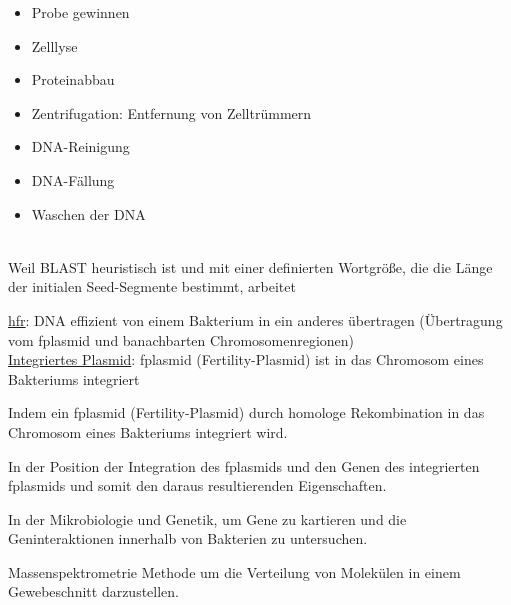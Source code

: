 \begin{itemize}
    \item Probe gewinnen 
    \item Zelllyse
    \item Proteinabbau
    \item Zentrifugation: Entfernung von Zelltrümmern
    \item DNA-Reinigung
    \item DNA-Fällung
    \item Waschen der DNA
\end{itemize} $\ $ \\
Weil BLAST heuristisch ist und mit einer definierten Wortgröße, die die Länge der initialen Seed-Segmente bestimmt, arbeitet \\ \newline

\underline{hfr}: DNA effizient von einem Bakterium in ein anderes übertragen (Übertragung vom \gls{fplasmid} und banachbarten Chromosomenregionen) \\
\underline{Integriertes Plasmid}: \gls{fplasmid} (Fertility-Plasmid) ist in das Chromosom eines Bakteriums integriert  \\ \newline

Indem ein \gls{fplasmid} (Fertility-Plasmid) durch homologe Rekombination in das Chromosom eines Bakteriums integriert wird. \\ \newline

In der Position der Integration des \gls{fplasmid}s und den Genen des integrierten \gls{fplasmid}s und somit den daraus resultierenden Eigenschaften.\\ \newline

In der Mikrobiologie und Genetik, um Gene zu kartieren und die Geninteraktionen innerhalb von Bakterien zu untersuchen. \\ \newline

Massenspektrometrie Methode um die Verteilung von Molekülen in einem Gewebeschnitt darzustellen. \\ \newline

